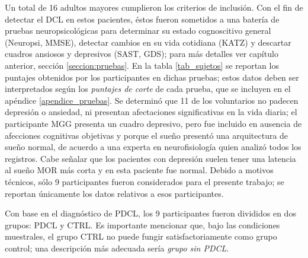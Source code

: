 \documentclass[12pt,letterpaper]{book}
\begin{document}
Un total de 16 adultos mayores cumplieron los criterios de inclusión. 
%
Con el fin de detectar el DCL en estos pacientes, éstos fueron sometidos a una batería de pruebas neuropsicológicas para determinar su estado cognoscitivo general (Neuropsi, MMSE), detectar cambios en su vida cotidiana (KATZ) y descartar cuadros ansiosos y depresivos (SAST, GDS); para más detalles ver capítulo anterior, sección \ref{seccion:pruebas}.
%
En la tabla \ref{tab_sujetos} se reportan los puntajes obtenidos por los participantes en dichas pruebas; estos datos deben ser interpretados según los \textit{puntajes de corte} de cada prueba, que se incluyen en el apéndice \ref{apendice_pruebas}.
%
Se determinó que 11 de los voluntarios no padecen depresión o ansiedad, ni presentan afectaciones significativas en la vida diaria; el participante MGG presenta un cuadro depresivo, pero fue incluido en ausencia de afecciones cognitivas objetivas y porque el sueño presentó una arquitectura de sueño normal, de acuerdo a una experta en neurofisiología quien analizó todos los registros. Cabe señalar que los pacientes con depresión suelen tener una latencia al sueño MOR más corta y en esta paciente fue normal.
%
Debido a motivos técnicos, sólo 9 participantes fueron considerados para el presente trabajo; se reportan únicamente los datos relativos a esos participantes.

Con base en el diagnóstico de PDCL, los 9 participantes fueron divididos en dos grupos: PDCL y CTRL. 
%
Es importante mencionar que, bajo las condiciones muestrales, el grupo CTRL no puede fungir satisfactoriamente como grupo control; una descripción más adecuada sería \textit{grupo sin PDCL}.

%
\end{document}

